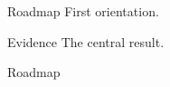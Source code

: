 \documentclass[11pt,aspectratio=169]{beamer}
\begin{document}
\begin{frame}{Roadmap}
  First orientation.
\end{frame}
\begin{frame}{Evidence}
  The central result.
\end{frame}
\begin{frame}{Roadmap}
\end{frame}
\end{document}

